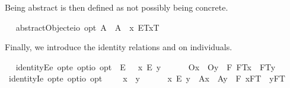 \begin{isabellebody}
\begin{isamarkuptext}%
Being abstract is then defined as not possibly being concrete.%
\end{isamarkuptext}\isamarkuptrue%
\ \isamarkupfalse%
\ abstractObject{\isacharcolon}{\isacharcolon}{\isachardoublequoteopen}{\isacharparenleft}e{\isasymRightarrow}io{\isacharparenright}\ opt{\isachardoublequoteclose}\ {\isacharparenleft}{\isachardoublequoteopen}A{\isacharbang}{\isachardoublequoteclose}{\isacharparenright}\ \ {\isachardoublequoteopen}A{\isacharbang}\ {\isasymequiv}\ \isactrlbold {\isasymlambda}x{\isachardot}\ \isactrlbold {\isasymnot}{\isacharparenleft}\isactrlbold {\isasymdiamond}{\isasymlparr}E{\isacharbang}\isactrlsup T{\isacharcomma}x\isactrlsup T{\isasymrparr}{\isacharparenright}{\isachardoublequoteclose}%
\begin{isamarkuptext}%
Finally, we introduce the identity relations  and \isa{\isactrlbold {\isacharequal}} on individuals.%
\end{isamarkuptext}\isamarkuptrue%
\ \isamarkupfalse%
\ identityE{\isacharcolon}{\isacharcolon}{\isachardoublequoteopen}e\ opt{\isasymRightarrow}e\ opt{\isasymRightarrow}io\ opt{\isachardoublequoteclose}\ {\isacharparenleft}\ {\isachardoublequoteopen}\isactrlbold {\isacharequal}\isactrlsub E{\isachardoublequoteclose}\ {}{}{\isacharparenright}\ \ {\isachardoublequoteopen}x\ \isactrlbold {\isacharequal}\isactrlsub E\ y\ {\isasymequiv}\ \isanewline
\ \ \ \ {\isasymlparr}O{\isacharbang}{\isacharcomma}x{\isasymrparr}\ \isactrlbold {\isasymand}\ {\isasymlparr}O{\isacharbang}{\isacharcomma}y{\isasymrparr}\ \isactrlbold {\isasymand}\ \isactrlbold {\isasymbox}{\isacharparenleft}\isactrlbold {\isasymforall}F{\isachardot}\ {\isasymlparr}F\isactrlsup T{\isacharcomma}x{\isasymrparr}\ \isactrlbold {\isasymequiv}\ {\isasymlparr}F\isactrlsup T{\isacharcomma}y{\isasymrparr}{\isacharparenright}{\isachardoublequoteclose}\isanewline
\isanewline
\ \isamarkupfalse%
\ identityI{\isacharcolon}{\isacharcolon}{\isachardoublequoteopen}e\ opt{\isasymRightarrow}e\ opt{\isasymRightarrow}io\ opt{\isachardoublequoteclose}\ {\isacharparenleft}\ {\isachardoublequoteopen}\isactrlbold {\isacharequal}{\isachardoublequoteclose}\ {}{}{\isacharparenright}\ \ {\isachardoublequoteopen}x\ \isactrlbold {\isacharequal}\ y\ {\isasymequiv}\ \isanewline
\ \ \ \ x\ \isactrlbold {\isacharequal}\isactrlsub E\ y\ \isactrlbold {\isasymor}\ {\isacharparenleft}{\isasymlparr}A{\isacharbang}{\isacharcomma}x{\isasymrparr}\ \isactrlbold {\isasymand}\ {\isasymlparr}A{\isacharbang}{\isacharcomma}y{\isasymrparr}\ \isactrlbold {\isasymand}\ \isactrlbold {\isasymbox}{\isacharparenleft}\isactrlbold {\isasymforall}F{\isachardot}\ {\isasymlbrace}x{\isacharcomma}F\isactrlsup T{\isasymrbrace}\ \isactrlbold {\isasymequiv}\ {\isasymlbrace}y{\isacharcomma}F\isactrlsup T{\isasymrbrace}{\isacharparenright}{\isacharparenright}{\isachardoublequoteclose}%

\end{isabellebody}
